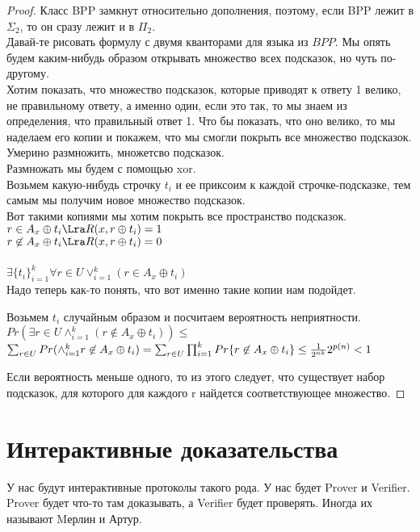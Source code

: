 \begin{proof}
	Класс BPP замкнут относительно дополнения, поэтому, если BPP лежит в $\Sigma_2$, то он сразу лежит и в $\Pi_2$.
	\\
	Давай-те рисовать формулу с двумя кванторами для языка из $BPP$. Мы опять будем каким-нибудь образом 
	открывать множество всех подсказок, но чуть по-другому. 
	\\
	Хотим показать, что множество подсказок, которые приводят к ответу 1 велико, не правильному ответу, а именно один, если это так, 
	то мы знаем из определения, что правильный ответ 1. 
	Что бы показать, что оно велико, то мы наделаем его копии и покажем, что мы смогли покрыть все множество подсказок. 
	Умерино размножить,  множетсво подсказок. 
	\\
	Размножать мы будем с помощью xor.
	\\
	Возьмем какую-нибудь строчку $t_i$ и ее приксоим к каждой строчке-подсказке, тем самым мы получим новое множество подсказок.
        \\
	Вот такими копиями мы хотим покрыть все пространство подсказок.\\
	$r \in A_x \oplus t_i \Lra R(x, r \oplus t_i) = 1$ \\
	$r \not \in A_x \oplus t_i \Lra R(x, r \oplus t_i) = 0$\\
	\\
	$\exists\{t_i\}_{i = 1}^{k} \forall r \in U \vee_{i = 1}^{k}(r \in A_x \oplus t_i)$ \\

	Надо теперь как-то понять, что вот именно такие копии нам подойдет.

	Возьмем $t_i$ случайным образом и посчитаем вероятность неприятности.
	$Pr(\exists r\in U \wedge_{i = 1}^{k}(r \not \in A_x \oplus t_i)) \le$\\
	$\sum_{r \in U}Pr(\wedge_{i = 1}^{k}r \not \in A_x \oplus t_i) = 
	\sum_{r \in U} \prod_{i = 1}^{k}Pr\{r \not \in A_x \oplus t_i\}\\
	\le \frac{1}{2^{nk}}2^{p(n)} < 1$

       Если вероятность меньше одного, то из этого следует, что существует набор подсказок, для которого 
       для каждого r найдется соответствующее множество. 
\end{proof}


\section{Интерактивные доказательства}
У нас будут интерактивные протоколы такого рода. У нас будет Prover и Verifier. 
Prover будет что-то там доказывать, а Verifier будет проверять. Иногда
их называют Mерлин и Артур. 


